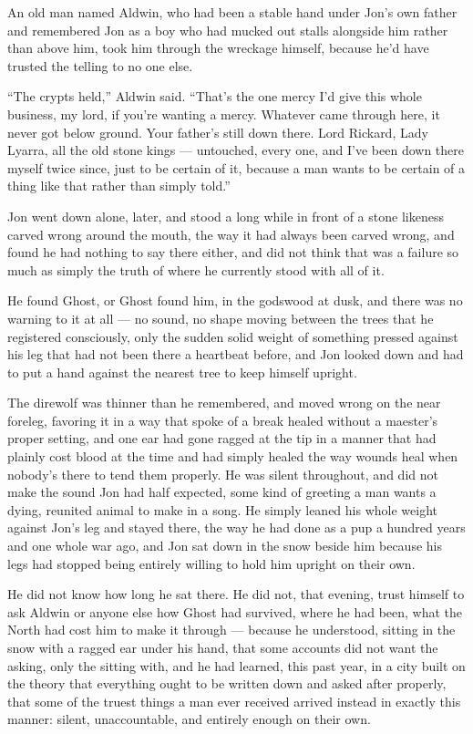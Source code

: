 An old man named Aldwin, who had been a stable hand under Jon’s own father and remembered Jon as a boy who had mucked out stalls alongside him rather than above him, took him through the wreckage himself, because he’d have trusted the telling to no one else.

“The crypts held,” Aldwin said. “That’s the one mercy I’d give this whole business, my lord, if you’re wanting a mercy. Whatever came through here, it never got below ground. Your father’s still down there. Lord Rickard, Lady Lyarra, all the old stone kings — untouched, every one, and I’ve been down there myself twice since, just to be certain of it, because a man wants to be certain of a thing like that rather than simply told.”

Jon went down alone, later, and stood a long while in front of a stone likeness carved wrong around the mouth, the way it had always been carved wrong, and found he had nothing to say there either, and did not think that was a failure so much as simply the truth of where he currently stood with all of it.

\sceneBreak

He found Ghost, or Ghost found him, in the godswood at dusk, and there was no warning to it at all — no sound, no shape moving between the trees that he registered consciously, only the sudden solid weight of something pressed against his leg that had not been there a heartbeat before, and Jon looked down and had to put a hand against the nearest tree to keep himself upright.

The direwolf was thinner than he remembered, and moved wrong on the near foreleg, favoring it in a way that spoke of a break healed without a maester’s proper setting, and one ear had gone ragged at the tip in a manner that had plainly cost blood at the time and had simply healed the way wounds heal when nobody’s there to tend them properly. He was silent throughout, and did not make the sound Jon had half expected, some kind of greeting a man wants a dying, reunited animal to make in a song. He simply leaned his whole weight against Jon’s leg and stayed there, the way he had done as a pup a hundred years and one whole war ago, and Jon sat down in the snow beside him because his legs had stopped being entirely willing to hold him upright on their own.

He did not know how long he sat there. He did not, that evening, trust himself to ask Aldwin or anyone else how Ghost had survived, where he had been, what the North had cost him to make it through — because he understood, sitting in the snow with a ragged ear under his hand, that some accounts did not want the asking, only the sitting with, and he had learned, this past year, in a city built on the theory that everything ought to be written down and asked after properly, that some of the truest things a man ever received arrived instead in exactly this manner: silent, unaccountable, and entirely enough on their own.

